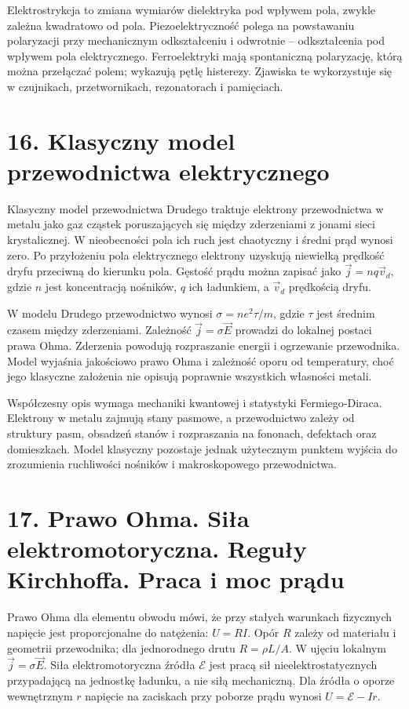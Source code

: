 \documentclass[11pt,a4paper,oneside]{report}
\begin{document}
Elektrostrykcja to zmiana wymiarów dielektryka pod wpływem pola, zwykle zależna kwadratowo od pola. Piezoelektryczność polega na powstawaniu polaryzacji przy mechanicznym odkształceniu i odwrotnie – odkształcenia pod wpływem pola elektrycznego. Ferroelektryki mają spontaniczną polaryzację, którą można przełączać polem; wykazują pętlę histerezy. Zjawiska te wykorzystuje się w czujnikach, przetwornikach, rezonatorach i pamięciach.

\section{16. Klasyczny model przewodnictwa elektrycznego}
Klasyczny model przewodnictwa Drudego traktuje elektrony przewodnictwa w metalu jako gaz cząstek poruszających się między zderzeniami z jonami sieci krystalicznej. W nieobecności pola ich ruch jest chaotyczny i średni prąd wynosi zero. Po przyłożeniu pola elektrycznego elektrony uzyskują niewielką prędkość dryfu przeciwną do kierunku pola. Gęstość prądu można zapisać jako \(\vec j=nq\vec v_d\), gdzie \(n\) jest koncentracją nośników, \(q\) ich ładunkiem, a \(\vec v_d\) prędkością dryfu.

W modelu Drudego przewodnictwo wynosi \(\sigma=n e^2\tau/m\), gdzie \(\tau\) jest średnim czasem między zderzeniami. Zależność \(\vec j=\sigma\vec E\) prowadzi do lokalnej postaci prawa Ohma. Zderzenia powodują rozpraszanie energii i ogrzewanie przewodnika. Model wyjaśnia jakościowo prawo Ohma i zależność oporu od temperatury, choć jego klasyczne założenia nie opisują poprawnie wszystkich własności metali.

Współczesny opis wymaga mechaniki kwantowej i statystyki Fermiego-Diraca. Elektrony w metalu zajmują stany pasmowe, a przewodnictwo zależy od struktury pasm, obsadzeń stanów i rozpraszania na fononach, defektach oraz domieszkach. Model klasyczny pozostaje jednak użytecznym punktem wyjścia do zrozumienia ruchliwości nośników i makroskopowego przewodnictwa.

\section{17. Prawo Ohma. Siła elektromotoryczna. Reguły Kirchhoffa. Praca i moc prądu}
Prawo Ohma dla elementu obwodu mówi, że przy stałych warunkach fizycznych napięcie jest proporcjonalne do natężenia: \(U=RI\). Opór \(R\) zależy od materiału i geometrii przewodnika; dla jednorodnego drutu \(R=\rho L/A\). W ujęciu lokalnym \(\vec j=\sigma\vec E\). Siła elektromotoryczna źródła \(\mathcal E\) jest pracą sił nieelektrostatycznych przypadającą na jednostkę ładunku, a nie siłą mechaniczną. Dla źródła o oporze wewnętrznym \(r\) napięcie na zaciskach przy poborze prądu wynosi \(U=\mathcal E-Ir\).
\end{document}
